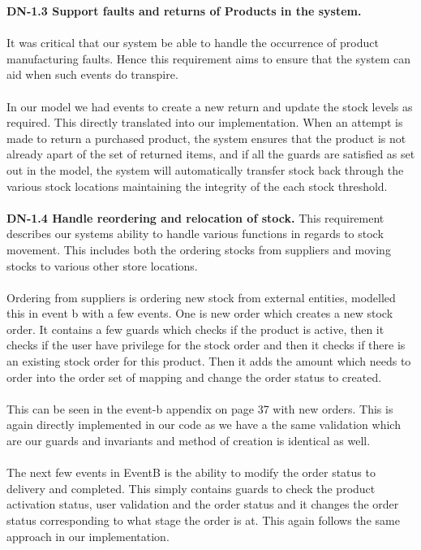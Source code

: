 \documentclass[a4paper]{article}
\begin{document}
\textbf{DN-1.3 Support faults and returns of Products in the system.}
\\\\
It was critical that our system be able to handle the occurrence of product manufacturing faults. Hence this requirement aims to ensure that the system can aid when such events do transpire.
\\\\
In our model we had events to create a new return and update the stock levels as required. This directly translated into our implementation. When an attempt is made to return a purchased product, the system ensures that the product is not already apart of the set of returned items, and if all the guards are satisfied as set out in the model, the system will automatically transfer stock back through the various stock locations maintaining the integrity of the each stock threshold.
\\\\
\textbf{DN-1.4 Handle reordering and relocation of stock.}
This requirement describes our systems ability to handle various functions in regards to stock movement. This includes both the ordering stocks from suppliers and moving stocks to various other store locations. 
\\\\
Ordering from suppliers is ordering new stock from external entities, modelled this in event b with a few events. One is new order which creates a new stock order. It contains a few guards which checks if the product is active, then it checks if the user have privilege for the stock order and then it checks if there is an existing stock order for this product. Then it adds the amount which needs to order into the order set of mapping and change the order status to created. 
\\\\
This can be seen in the event-b appendix on page 37 with new orders. This is again directly implemented in our code as we have a the same validation which are our guards and invariants and method of creation is identical as well. 
\\\\
The next few events in EventB is the ability to modify the order status to delivery and completed. This simply contains guards to check the product activation status, user validation and the order status and it changes the order status corresponding to what stage the order is at. This again follows the same approach in our implementation. 
\\\\
\end{document}
